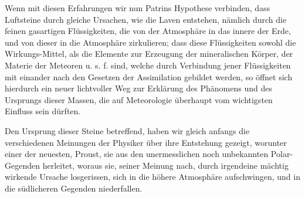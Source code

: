 \documentclass[a4paper, 11pt, oneside, polutonikogreek, german]{article}
\begin{document}
Wenn mit diesen Erfahrungen wir nun Patrins Hypothese verbinden, dass Luftsteine durch gleiche Ursachen, wie die Laven entstehen, nämlich durch die feinen gasartigen Flüssigkeiten, die von der Atmosphäre in das innere der Erde, und von dieser in die Atmosphäre zirkulieren; dass diese Flüssigkeiten sowohl die Wirkungs-Mittel, als die Elemente zur Erzeugung der mineralischen Körper, der Materie der Meteoren u. s. f. sind, welche durch Verbindung jener Flüssigkeiten mit einander nach den Gesetzen der Assimilation gebildet werden, so öffnet sich hierdurch ein neuer lichtvoller Weg zur Erklärung des Phänomens und des Ursprungs dieser Massen, die auf Meteorologie überhaupt vom wichtigsten Einfluss sein dürften.

Den Ursprung dieser Steine betreffend, haben wir gleich anfangs die verschiedenen Meinungen der Physiker über ihre Entstehung gezeigt, worunter einer der neuesten, Proust, sie aus den unermesslichen noch unbekannten Polar-Gegenden herleitet, woraus sie, seiner Meinung nach, durch irgendeine mächtig wirkende Ursache losgerissen, sich in die höhere Atmosphäre aufschwingen, und in die südlicheren Gegenden niederfallen.
\end{document}
